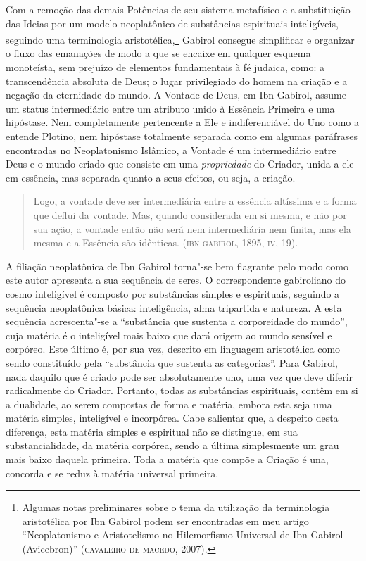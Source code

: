 Com a remoção das demais Potências de seu sistema metafísico e a
substituição das Ideias por um modelo neoplatônico de substâncias
espirituais inteligíveis, seguindo uma terminologia
aristotélica,\footnote{ Algumas notas preliminares sobre o tema da
utilização da terminologia aristotélica por Ibn Gabirol podem ser
encontradas em meu artigo “Neoplatonismo e Aristotelismo no
Hilemorfismo Universal de Ibn Gabirol (Avicebron)” (\textsc{cavaleiro}
\textsc{de}
\textsc{macedo}, 2007).} Gabirol consegue simplificar e organizar o fluxo das
emanações de modo a que se encaixe em qualquer esquema monoteísta,
sem prejuízo de elementos fundamentais à fé judaica, como: a
transcendência absoluta de Deus; o lugar privilegiado do homem na
criação e a negação da eternidade do mundo. A Vontade de Deus, em Ibn
Gabirol, assume um status intermediário entre um atributo unido à
Essência Primeira e uma hipóstase. Nem completamente pertencente a
Ele e indiferenciável do Uno como a entende Plotino, nem hipóstase
totalmente separada como em algumas paráfrases encontradas no
Neoplatonismo Islâmico, a Vontade é um intermediário entre Deus e o
mundo criado que consiste em uma \emph{propriedade} do Criador,
unida a ele em essência, mas separada quanto a seus efeitos, ou seja,
a criação.

\begin{quote}
Logo, a vontade deve ser intermediária entre a essência altíssima e a
forma que deflui da vontade. Mas, quando considerada em si mesma, e
não por sua ação, a vontade então não será nem intermediária nem
finita, mas ela mesma e a Essência são idênticas. (\textsc{ibn}
\textsc{gabirol}, 1895,
\textsc{iv}, 19).
\end{quote}

A filiação neoplatônica de Ibn Gabirol torna"-se bem flagrante pelo
modo como este autor apresenta a sua sequência de seres. O
correspondente gabiroliano do cosmo inteligível é composto por
substâncias simples e espirituais, seguindo a sequência neoplatônica
básica: inteligência, alma tripartida e natureza. A esta sequência
acrescenta"-se a “substância que sustenta a corporeidade do mundo”,
cuja matéria é o inteligível mais baixo que dará origem ao mundo
sensível e corpóreo. Este último é, por sua vez, descrito em
linguagem aristotélica como sendo constituído pela “substância que
sustenta as categorias”. Para Gabirol, nada daquilo que é criado pode
ser absolutamente uno, uma vez que deve diferir radicalmente do
Criador. Portanto, todas as substâncias espirituais, contêm em si a
dualidade, ao serem compostas de forma e matéria, embora esta seja
uma matéria simples, inteligível e incorpórea. Cabe salientar que, a
despeito desta diferença, esta matéria simples e espiritual não se
distingue, em sua substancialidade, da matéria corpórea, sendo a
última simplesmente um grau mais baixo daquela primeira. Toda a
matéria que compõe a Criação é una, concorda e se reduz à matéria
universal primeira. 

